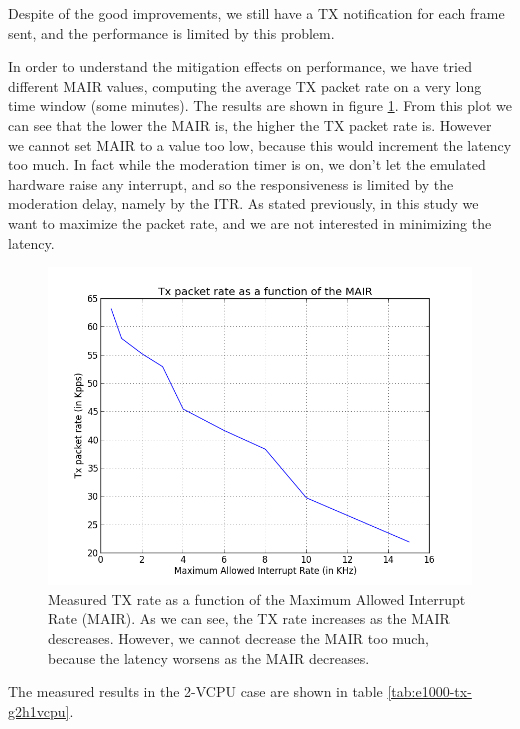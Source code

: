 Despite of the good improvements, we still have a TX notification for each frame sent, and the performance is limited by this
problem.

\vspace{0.5cm}

In order to understand the mitigation effects on performance, we have tried different MAIR values, computing the average TX packet 
rate on a very long time window (some minutes). The results are shown in figure \ref{fig:itr-vs-txrate}.
From this plot we can see that the lower the MAIR is, the higher the TX packet rate is. However we cannot set MAIR to a value too low,
because this would increment the latency too much. In fact while the moderation timer is on, we don't let the emulated hardware raise
any interrupt, and so the responsiveness is limited by the moderation delay, namely by the ITR.
As stated previously, in this study we want to maximize the packet rate, and we are not interested in minimizing the latency.

\begin{figure}[bt]
\centering
\includegraphics[scale = 0.7]{MAIR-vs-TXRate.png}
\caption{Measured TX rate as a function of the Maximum Allowed Interrupt Rate (MAIR). As we can see, the TX rate increases as the MAIR
	descreases. However, we cannot decrease the MAIR too much, because the latency worsens as the MAIR decreases.}
\label{fig:itr-vs-txrate}
\end{figure}

\vspace{0.5cm}

The measured results in the 2-VCPU case are shown in table \ref{tab:e1000-tx-g2h1vcpu}.

